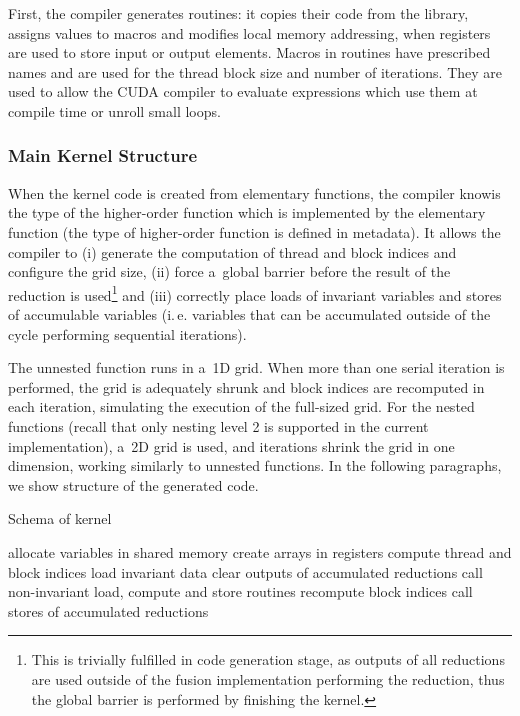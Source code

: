 \documentclass[final]{siamltex}
\def\ie{i.\,e.}
\begin{document}
{First, the compiler generates routines: it copies their code from the library, assigns values to macros and modifies local memory addressing, when registers are used to store input or output elements. Macros in routines have prescribed names and are used for the thread block size and number of iterations. They are used to allow the CUDA compiler to evaluate expressions which use them at compile time or unroll small loops.

\subsubsection{Main Kernel Structure}

When the kernel code is created from elementary functions, the compiler knowis the type of the higher-order function which is implemented by the elementary function (the type of higher-order function is defined in metadata). It allows the compiler to (i) generate the computation of thread and block indices and configure the grid size, (ii) force a~global barrier before the result of the reduction is used\footnote{This is trivially fulfilled in code generation stage, as outputs of all reductions are used outside of the fusion implementation performing the reduction, thus the global barrier is performed by finishing the kernel.} and (iii) correctly place loads of invariant variables and stores of accumulable variables (\ie{} variables that can be accumulated outside of the cycle performing sequential iterations).

The unnested function runs in a~1D grid. When more than one serial iteration is performed, the grid is adequately shrunk and block indices are recomputed in each iteration, simulating the execution of the full-sized grid. For the nested functions (recall that only nesting level 2 is supported in the current implementation), a~2D grid is used, and iterations shrink the grid in one dimension, working similarly to unnested functions. In the following paragraphs, we show structure of the generated code.

\begin{algorithm}[subsection]
\caption{Schema of kernel}
\label{alg:kernel}
{
\begin{algorithmic}[1]
{
\STATE allocate variables in shared memory
\STATE create arrays in registers
\STATE compute thread and block indices
\STATE load invariant data
\STATE clear outputs of accumulated reductions
\FOR{}
\STATE call non-invariant load, compute and store routines
\STATE recompute block indices
\ENDFOR
\STATE call stores of accumulated reductions
}
\end{algorithmic}
}
\end{algorithm}

}
\end{document}
